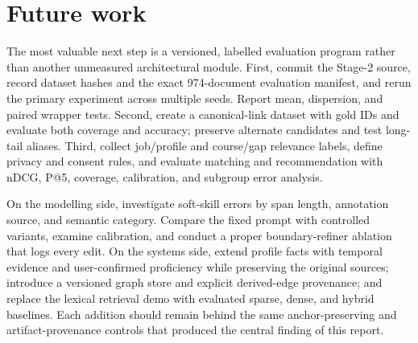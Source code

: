 \section{Future work}

The most valuable next step is a versioned, labelled evaluation program rather than another unmeasured architectural module. First, commit the Stage-2 source, record dataset hashes and the exact 974-document evaluation manifest, and rerun the primary experiment across multiple seeds. Report mean, dispersion, and paired wrapper tests. Second, create a canonical-link dataset with gold IDs and evaluate both coverage and accuracy; preserve alternate candidates and test long-tail aliases. Third, collect job/profile and course/gap relevance labels, define privacy and consent rules, and evaluate matching and recommendation with nDCG, P@5, coverage, calibration, and subgroup error analysis.

On the modelling side, investigate soft-skill errors by span length, annotation source, and semantic category. Compare the fixed prompt with controlled variants, examine calibration, and conduct a proper boundary-refiner ablation that logs every edit. On the systems side, extend profile facts with temporal evidence and user-confirmed proficiency while preserving the original sources; introduce a versioned graph store and explicit derived-edge provenance; and replace the lexical retrieval demo with evaluated sparse, dense, and hybrid baselines. Each addition should remain behind the same anchor-preserving and artifact-provenance controls that produced the central finding of this report.
